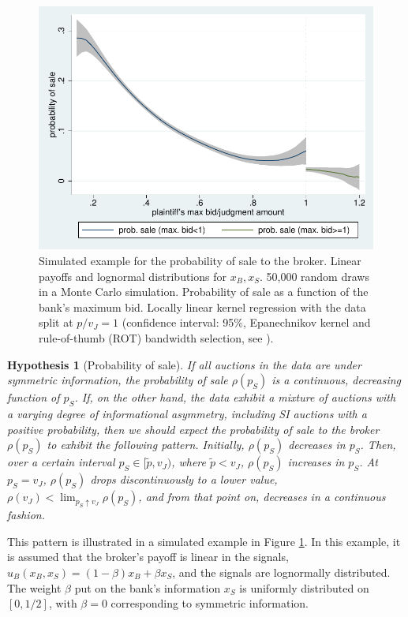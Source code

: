 \documentclass[11pt,twopage]{article}
\newtheorem{conjecture}{Hypothesis}
{\bf}{\it}
\begin{document}
\begin{figure} %
\centering
\includegraphics[scale=0.6]{graphics/simulated_simple_discontinuity}
\caption{Simulated example for the probability of sale to the broker. Linear payoffs and lognormal distributions for $x_B,x_S$. 50,000 random draws in a Monte Carlo simulation. Probability of sale as a function of the bank's maximum bid. Locally linear kernel regression with the data split at $p/v_J=1$ (confidence interval: 95\%, Epanechnikov kernel and rule-of-thumb (ROT) bandwidth selection, see \cite{fan1996local}).}
%		
\label{fig:theory-probability-of-sale_sim}
\end{figure}
\begin{conjecture}[Probability of sale]\label{hyp:discontinuity}
If all auctions in the data are under symmetric information, the probability of sale $\rho(p_S)$ is a continuous, decreasing function of $p_S$. If, on the other hand, the data exhibit a mixture of auctions with a varying degree of informational asymmetry, including SI auctions with a positive probability, then we should expect the probability of sale to the broker $\rho(p_S)$ to exhibit the following pattern. Initially, $\rho(p_S)$ decreases in $p_S$. Then, over a certain interval $p_S \in [\tilde p, v_J)$, where $\tilde p < v_J$, $\rho(p_S)$ increases in $p_S$. At $p_S = v_J$, $\rho(p_S)$ drops discontinuously to a lower value, $\rho(v_J)<\lim_{p_S \uparrow v_J} \rho(p_S)$, and from that point on, decreases in a continuous fashion.
\end{conjecture}
This pattern is illustrated in a simulated example in Figure \ref{fig:theory-probability-of-sale_sim}. In this example, it is assumed that the broker's payoff is linear in the signals, $u_B(x_B,x_S) = (1-\beta) x_B+\beta x_S$, and the signals are lognormally distributed. The weight $\beta$ put on the bank's information $x_S$ is uniformly distributed on $[0,1/2]$, with $\beta = 0$ corresponding to symmetric information.
\end{document}

